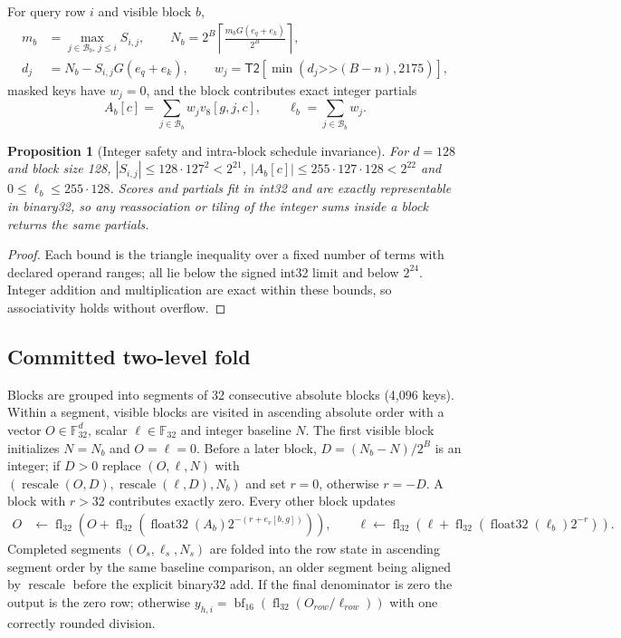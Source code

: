 \documentclass{article}
\newtheorem{Prop}[Thm]{Proposition}
\newcommand{\Fth}{\mathbb{F}_{32}}
\newcommand{\fl}{\operatorname{fl}_{32}}
\newcommand{\bfround}{\operatorname{bf}_{16}}
\newcommand{\rescale}{\operatorname{rescale}}
\begin{document}
For query row $i$ and visible block $b$,
\begin{align}
  m_b &= \max_{j\in\mathcal{B}_b,\,j\leq i} S_{i,j},\qquad
  N_b = 2^B\left\lceil\frac{m_bG(e_q+e_k)}{2^B}\right\rceil,\\
  d_j &= N_b-S_{i,j}G(e_q+e_k),\qquad
  w_j = \mathsf{T2}\!\left[\min\left(d_j\mathbin{\texttt{>>}}(B-n),2175\right)\right],
  \label{eq:weights}
\end{align}
masked keys have $w_j=0$, and the block contributes exact integer partials
\begin{equation}
  A_b[c]=\sum_{j\in\mathcal{B}_b}w_jv_8[g,j,c],\qquad
  \ell_b=\sum_{j\in\mathcal{B}_b}w_j.
  \label{eq:partials}
\end{equation}

\begin{Prop}[Integer safety and intra-block schedule invariance]
\label{prop:bounds}
For $d=128$ and block size 128, $|S_{i,j}|\leq128\cdot127^2<2^{21}$,
$|A_b[c]|\leq255\cdot127\cdot128<2^{22}$ and $0\leq\ell_b\leq255\cdot128$.  Scores and
partials fit in int32 and are exactly representable in binary32, so any reassociation or
tiling of the integer sums inside a block returns the same partials.
\end{Prop}

\begin{proof}
Each bound is the triangle inequality over a fixed number of terms with declared operand
ranges; all lie below the signed int32 limit and below $2^{24}$.  Integer addition and
multiplication are exact within these bounds, so associativity holds without overflow.
\end{proof}

\subsection{Committed two-level fold}

Blocks are grouped into segments of 32 consecutive absolute blocks (4,096 keys).  Within a
segment, visible blocks are visited in ascending absolute order with a vector $O\in\Fth^d$,
scalar $\ell\in\Fth$ and integer baseline $N$.  The first visible block initializes $N=N_b$
and $O=\ell=0$.  Before a later block, $D=(N_b-N)/2^B$ is an integer; if $D>0$ replace
$(O,\ell,N)$ with $(\rescale(O,D),\rescale(\ell,D),N_b)$ and set $r=0$, otherwise $r=-D$.  A
block with $r>32$ contributes exactly zero.  Every other block updates
\begin{align}
 O &\leftarrow \fl\!\left(O+\fl\!\left(\operatorname{float32}(A_b)2^{-(r+e_v[b,g])}\right)\right),\qquad
 \ell \leftarrow \fl\!\left(\ell+\fl\!\left(\operatorname{float32}(\ell_b)2^{-r}\right)\right).
 \label{eq:blockfold}
\end{align}
Completed segments $(O_s,\ell_s,N_s)$ are folded into the row state in ascending segment
order by the same baseline comparison, an older segment being aligned by $\rescale$ before
the explicit binary32 add.  If the final denominator is zero the output is the zero row;
otherwise $y_{h,i}=\bfround(\fl(O_{row}/\ell_{row}))$ with one correctly rounded division.
\end{document}
